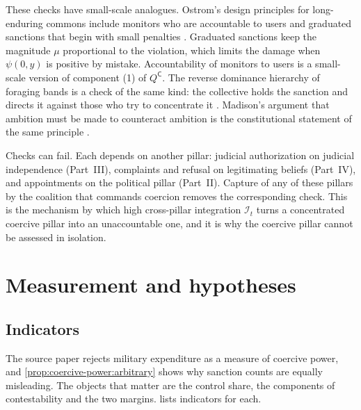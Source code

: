 \documentclass[11pt,letterpaper]{article}
\theoremstyle{definition}
\theoremstyle{remark}
\newcommand{\pC}{\mathsf{C}}
\newcommand{\Integ}{\mathcal{I}}
\begin{document}
These checks have small-scale analogues. Ostrom's design principles for long-enduring commons include monitors who are accountable to users and graduated sanctions that begin with small penalties \citep{ostrom1990,ostromdesign2010}. Graduated sanctions keep the magnitude $\mu$ proportional to the violation, which limits the damage when $\psi(0,y)$ is positive by mistake. Accountability of monitors to users is a small-scale version of component (1) of $Q^{\pC}$. The reverse dominance hierarchy of foraging bands is a check of the same kind: the collective holds the sanction and directs it against those who try to concentrate it \citep{boehm1999}. Madison's argument that ambition must be made to counteract ambition is the constitutional statement of the same principle \citep{madison1788}.

Checks can fail. Each depends on another pillar: judicial authorization on judicial independence (Part~III), complaints and refusal on legitimating beliefs (Part~IV), and appointments on the political pillar (Part~II). Capture of any of these pillars by the coalition that commands coercion removes the corresponding check. This is the mechanism by which high cross-pillar integration $\Integ_t$ turns a concentrated coercive pillar into an unaccountable one, and it is why the coercive pillar cannot be assessed in isolation.

\section{Measurement and hypotheses}
\label{sec:measurement}

\subsection{Indicators}

The source paper rejects military expenditure as a measure of coercive power, and \cref{prop:coercive-power:arbitrary} shows why sanction counts are equally misleading. The objects that matter are the control share, the components of contestability and the two margins.  lists indicators for each.
\end{document}

